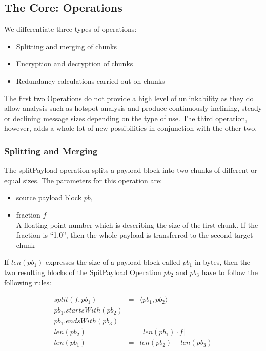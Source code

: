 \documentclass[10pt,journal,compsoc]{IEEEtran}
\begin{document}
\subsection{The Core: Operations}
We differentiate three types of operations:
\begin{itemize}
	\item Splitting and merging of chunks
	\item Encryption and decryption of chunks
	\item Redundancy calculations carried out on chunks
\end{itemize}

The first two Operations do not provide a high level of unlinkability as they do allow analysis such as hotspot analysis and produce continuously inclining, steady or declining message sizes depending on the type of use. The third operation, however, adds a whole lot of new possibilities in conjunction with the other two.

\subsubsection{Splitting and Merging}
The splitPayload operation splits a payload block into two chunks of different or equal sizes. The parameters for this operation are:

\begin{itemize}
	\item source payload block $pb_1$
	\item fraction $f$\\
	A floating-point number which is describing the size of the first chunk. If the fraction is ``1.0'', then the whole payload is transferred to the second target chunk
\end{itemize}

If $len(pb_1)$ expresses the size of a payload block called $pb_1$ in bytes, then the two resulting blocks of the SpitPayload Operation $pb_2$ and $pb_3$ have to follow the following rules:

\begin{eqnarray}
split(f, pb_1) & = &\langle pb_1, pb_2 \rangle\\
pb_1.startsWith(pb_2)\\
pb_1.endsWith(pb_3)\\
len(pb_2) & = & \lfloor len(pb_1)\cdot f\rfloor\\
len(pb_1) & = & len(pb_2) + len(pb_3)
\end{eqnarray}
\end{document}
